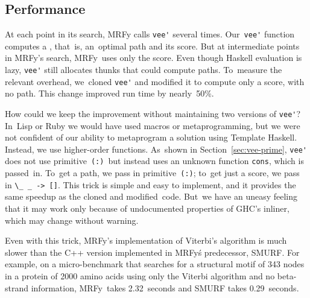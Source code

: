 \documentclass[preprint,nonatbib,blockstyle,times]{sigplanconf}
\newcommand\mrfy{MRFy} %
\newcommand\primcons{\texttt{\small(:)}}
\newcommand\secref[1]{Section~\ref{sec:#1}}
\newcommand\seclabel[1]{\label{sec:#1}}
\begin{document}


\subsection{Performance}

\seclabel{perf}
\seclabel{performance}

At each point in its search,
MRFy calls \verb+vee'+ several
 times.
Our~\verb+vee'+
function computes a \mbox{}, that~is, 
an~optimal path and its score.
But at intermediate points in \mrfy's search,
\mrfy\ uses only the
score.
Even though Haskell evaluation is lazy, \verb+vee'+ 
still allocates thunks that could compute paths.
To~measure the relevant overhead,
we~cloned \verb+vee'+ and modified it to compute
only a score, with no path.
This change improved 
run time by nearly~50\%.

How could we keep the improvement without 
maintaining two versions of \verb+vee'+?
In~Lisp or Ruby we would have used macros or metaprogramming,
but we were not confident of our ability to metaprogram a solution
using Template Haskell.
Instead, we use higher-order functions.
As~shown in \secref{vee-prime},
\verb+vee'+ does not use primitive~\primcons\ but instead
uses an unknown function \texttt{cons}, which is
passed~in.
To~get a path, we pass in primitive~\primcons;
to~get just a score, we pass in
\verb+\_ _ -> []+.
This trick is simple and easy to implement, and it provides the same
speedup as the cloned and modified~code.
But~we have an uneasy feeling that it may work only because of
undocumented properties of GHC's inliner, which may 
change without warning. 

Even with this trick,
MRFy's implementation of Viterbi's algorithm is much
slower than the C++ version implemented in \mrfy\'s predecessor,
SMURF.
For example, on a micro-benchmark that searches for a
structural motif of 343 nodes in a protein of 2000 amino acids
using only the Viterbi algorithm and no beta-strand information,
\mrfy\ takes 2.32~seconds and
SMURF takes 0.29~seconds.
\end{document}
